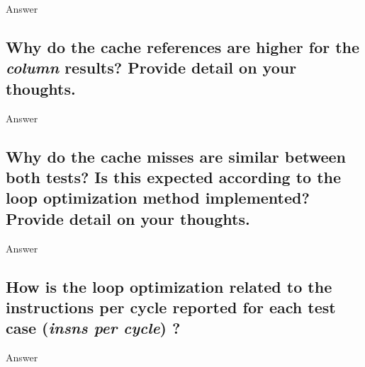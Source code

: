 \documentclass[12pt]{article}%
\begin{document}
Answer

\subsection {Why do the cache references are higher for the \textit{column} results? Provide detail on your thoughts.}

Answer

\subsection {Why do the cache misses are similar between both tests? Is this expected according to the loop optimization method implemented? Provide detail on your thoughts.}

Answer

\subsection {How is the loop optimization related to the instructions per cycle reported for each test case (\textit{insns per cycle}) ?}

Answer
\end{document}
